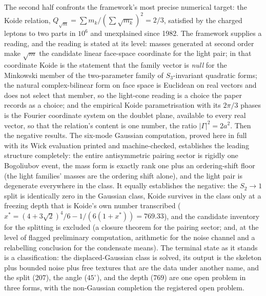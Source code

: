 \documentclass[11pt]{article}
\theoremstyle{definition}
\theoremstyle{plain}
\begin{document}
The second half confronts the framework's most precise numerical target: the Koide relation, $Q_{\sqrt{m}} = \sum m_{k} / (\sum \sqrt{m_{k}})^{2} = 2/3$, satisfied by the charged leptons to two parts in $10^{6}$ and unexplained since 1982. The framework supplies a reading, and the reading is stated at its level: masses generated at second order make $\sqrt{m}$ the candidate linear face-space coordinate for the light pair; in that coordinate Koide is the statement that the family vector is \emph{null} for the Minkowski member of the two-parameter family of $S_{3}$-invariant quadratic forms; the natural complex-bilinear form on face space is Euclidean on real vectors and does not select that member, so the light-cone reading is a choice the paper records as a choice; and the empirical Koide parametrisation with its $2\pi/3$ phases is the Fourier coordinate system on the doublet plane, available to every real vector, so that the relation's content is one number, the ratio $|\Gamma|^{2} = 2a^{2}$. Then the negative results. The six-mode Gaussian computation, proved here in full with its Wick evaluation printed and machine-checked, establishes the leading structure completely: the entire antisymmetric pairing sector is rigidly one Bogoliubov event, the mass form is exactly rank one plus an ordering-shift floor (the light families' masses are the ordering shift alone), and the light pair is degenerate everywhere in the class. It equally establishes the negative: the $S_{2} \to 1$ split is identically zero in the Gaussian class, Koide survives in the class only at a freezing depth that is Koide's own number transcribed ($x^{*} = (4+3\sqrt{2})^{4}/6 - 1/(6(1+x^{*})) = 769.33$), and the candidate inventory for the splitting is excluded (a closure theorem for the pairing sector; and, at the level of flagged preliminary computation, arithmetic for the noise channel and a relabelling conclusion for the condensate means). The terminal state as it stands is a classification: the displaced-Gaussian class is solved, its output is the skeleton plus bounded noise plus free textures that are the data under another name, and the split ($207$), the angle ($45^{\circ}$), and the depth ($769$) are one open problem in three forms, with the non-Gaussian completion the registered open problem.
\end{document}
